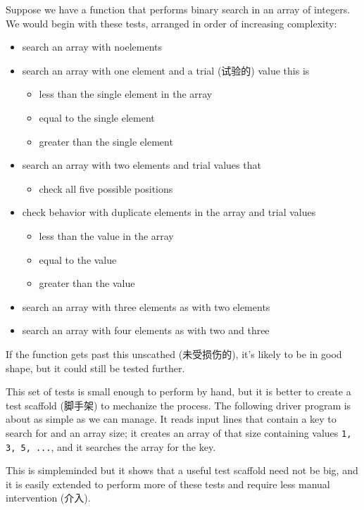 Suppose we have a function that performs binary search in an array of
integers.  We would begin with these tests, arranged in order of increasing
complexity:
\begin{itemize}
    \item search an array with noelements
    \item search an array with one element and a trial (试验的) value this
        is
        \begin{itemize}
            \item less than the single element in the array
            \item equal to the single element
            \item greater than the single element
        \end{itemize}
    \item search an array with two elements and trial values that
        \begin{itemize}
            \item check all five possible positions
        \end{itemize}
    \item check behavior with duplicate elements in the array and trial
        values
        \begin{itemize}
            \item less than the value in the array
            \item equal to the value
            \item greater than the value
        \end{itemize}
    \item search an array with three elements as with two elements
    \item search an array with four elements as with two and three
\end{itemize}
If the function gets past this unscathed (未受损伤的), it's likely to be in
good shape, but it could still be tested further.

This set of tests is small enough to perform by hand, but it is better to
create a test scaffold (脚手架) to mechanize the process. The following
driver program is about as simple as we can manage. It reads input lines
that contain a key to search for and an array size; it creates an array of
that size containing values \verb'1, 3, 5, ...', and it searches the array
for the key.
This is simpleminded but it shows that a useful test scaffold need not be
big, and it is easily extended to perform more of these tests and require
less manual intervention (介入).

